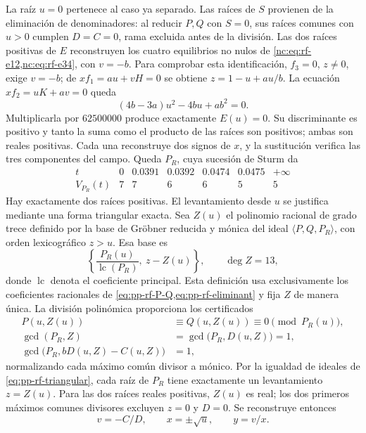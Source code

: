 La raíz \(u=0\) pertenece al caso ya separado. Las raíces de \(S\)
provienen de la eliminación de denominadores: al reducir \(P,Q\) con
\(S=0\), sus raíces comunes con \(u>0\) cumplen \(D=C=0\), rama
excluida antes de la división. Las dos raíces positivas de
\(E\) reconstruyen los cuatro equilibrios no nulos de
\cref{nc:eq:rf-e12,nc:eq:rf-e34}, con \(v=-b\). Para comprobar esta
identificación, \(f_3=0\), \(z\ne0\), exige \(v=-b\);
de \(xf_1=au+vH=0\) se obtiene \(z=1-u+au/b\).
La ecuación \(xf_2=uK+av=0\) queda
\[
 (4b-3a)u^2-4bu+ab^2=0.
\]
Multiplicarla por \(62500000\) produce exactamente \(E(u)=0\).
Su discriminante es positivo y tanto la suma como el producto de las
raíces son positivos; ambas son reales positivas. Cada una reconstruye
dos signos de \(x\), y la sustitución verifica las tres componentes del
campo. Queda \(P_R\), cuya
sucesión de Sturm da
\[
 \begin{array}{c|rrrrrr}
 t&0&0.0391&0.0392&0.0474&0.0475&+\infty\\\hline
 V_{P_R}(t)&7&7&6&6&5&5
 \end{array}
\]
Hay exactamente dos raíces positivas. El levantamiento desde \(u\) se
justifica mediante una forma triangular exacta. Sea \(Z(u)\) el
polinomio racional de grado trece definido por la base de Gröbner reducida
y mónica del ideal \(\langle P,Q,P_R\rangle\), con orden lexicográfico
\(z>u\). Esa base es
\begin{equation}
 \left\{\frac{P_R(u)}{\operatorname{lc}(P_R)},\ z-Z(u)\right\},
 \qquad \deg Z=13,
 \label{eq:pp-rf-triangular}
\end{equation}
donde \(\operatorname{lc}\) denota el coeficiente principal. Esta
definición usa exclusivamente los coeficientes racionales de
\cref{eq:pp-rf-P-Q,eq:pp-rf-eliminant} y fija \(Z\) de manera única.
La división polinómica proporciona los certificados
\begin{align}
 P(u,Z(u))&\equiv Q(u,Z(u))\equiv0\pmod{P_R(u)},\nonumber\\
 \gcd(P_R,Z)&=\gcd\bigl(P_R,D(u,Z)\bigr)=1,\nonumber\\
 \gcd\bigl(P_R,bD(u,Z)-C(u,Z)\bigr)&=1,
 \label{eq:pp-rf-lifting-certificates}
\end{align}
normalizando cada máximo común divisor a mónico. Por la igualdad de
ideales de \cref{eq:pp-rf-triangular}, cada raíz de \(P_R\) tiene
exactamente un levantamiento \(z=Z(u)\). Para las dos raíces reales
positivas, \(Z(u)\) es real; los dos primeros máximos comunes divisores
excluyen \(z=0\) y \(D=0\). Se reconstruye entonces
\begin{equation}
 v=-C/D,\qquad x=\pm\sqrt u,\qquad y=v/x.
 \label{eq:pp-rf-reconstruction}
\end{equation}
